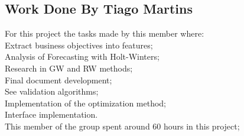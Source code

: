 \newpage

\subsection{Work Done By Tiago Martins}

\quad For this project the tasks made by this member where:\\

\quad \textbullet Extract business objectives into features;\\

\quad \textbullet Analysis of Forecasting with Holt-Winters;\\

\quad \textbullet Research in GW and RW methods;\\

\quad \textbullet Final document development;\\

\quad \textbullet See validation algorithms;\\

\quad \textbullet Implementation of the optimization method;\\

\quad \textbullet Interface implementation.\\


This member of the group spent around 60 hours in this project;
